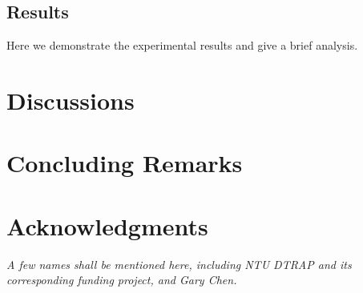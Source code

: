 \subsection{Results}
Here we demonstrate the experimental results and give a brief analysis.

\section{Discussions}

\section{Concluding Remarks}

\section{Acknowledgments}
\it A few names shall be mentioned here, including NTU DTRAP and its corresponding funding project, and Gary Chen.


